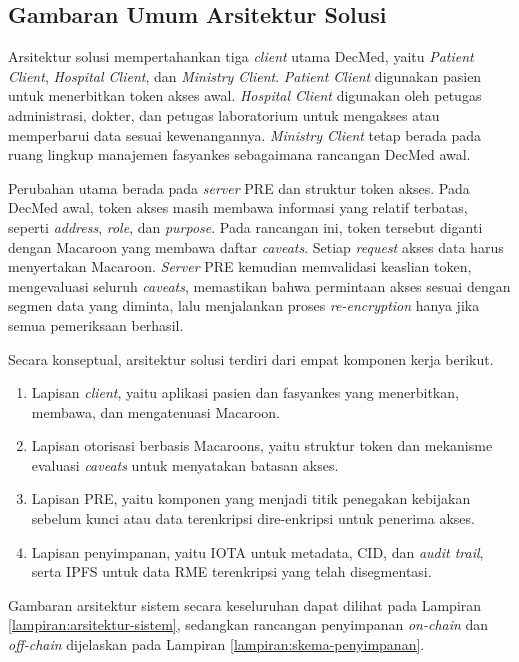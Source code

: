 \subsection{Gambaran Umum Arsitektur Solusi}
\label{subsec:gambaran-umum-arsitektur-solusi}

Arsitektur solusi mempertahankan tiga \textit{client} utama DecMed, yaitu \textit{Patient Client}, \textit{Hospital Client}, dan \textit{Ministry Client}. \textit{Patient Client} digunakan pasien untuk menerbitkan token akses awal. \textit{Hospital Client} digunakan oleh petugas administrasi, dokter, dan petugas laboratorium untuk mengakses atau memperbarui data sesuai kewenangannya. \textit{Ministry Client} tetap berada pada ruang lingkup manajemen fasyankes sebagaimana rancangan DecMed awal.

Perubahan utama berada pada \textit{server} PRE dan struktur token akses. Pada DecMed awal, token akses masih membawa informasi yang relatif terbatas, seperti \textit{address}, \textit{role}, dan \textit{purpose}. Pada rancangan ini, token tersebut diganti dengan Macaroon yang membawa daftar \textit{caveats}. Setiap \textit{request} akses data harus menyertakan Macaroon. \textit{Server} PRE kemudian memvalidasi keaslian token, mengevaluasi seluruh \textit{caveats}, memastikan bahwa permintaan akses sesuai dengan segmen data yang diminta, lalu menjalankan proses \textit{re-encryption} hanya jika semua pemeriksaan berhasil.

Secara konseptual, arsitektur solusi terdiri dari empat komponen kerja berikut.

\begin{enumerate}[leftmargin=*]
	\item Lapisan \textit{client}, yaitu aplikasi pasien dan fasyankes yang menerbitkan, membawa, dan mengatenuasi Macaroon.
	\item Lapisan otorisasi berbasis Macaroons, yaitu struktur token dan mekanisme evaluasi \textit{caveats} untuk menyatakan batasan akses.
	\item Lapisan PRE, yaitu komponen yang menjadi titik penegakan kebijakan sebelum kunci atau data terenkripsi dire-enkripsi untuk penerima akses.
	\item Lapisan penyimpanan, yaitu IOTA untuk metadata, CID, dan \textit{audit trail}, serta IPFS untuk data RME terenkripsi yang telah disegmentasi.
\end{enumerate}

Gambaran arsitektur sistem secara keseluruhan dapat dilihat pada Lampiran \ref{lampiran:arsitektur-sistem}, sedangkan rancangan penyimpanan \textit{on-chain} dan \textit{off-chain} dijelaskan pada Lampiran \ref{lampiran:skema-penyimpanan}.
